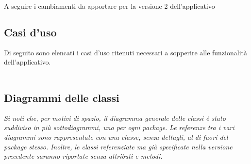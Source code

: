 A seguire i cambiamenti da apportare per la versione 2 dell'applicativo

\subsection{Casi d'uso}
Di seguito sono elencati i casi d'uso ritenuti necessari a sopperire alle funzionalità
dell'applicativo.
\\\\





\pagebreak


\pagebreak
\subsection{Diagrammi delle classi}

\textit{Si noti che, per motivi di spazio, il diagramma generale delle classi è stato suddiviso in più sottodiagrammi, uno per ogni package.}
\textit{Le referenze tra i vari diagrammi sono rappresentate con una classe, senza dettagli, al di fuori del package stesso.}
\textit{Inoltre, le classi referenziate ma già specificate nella versione precedente saranno riportate senza attributi e metodi.}



